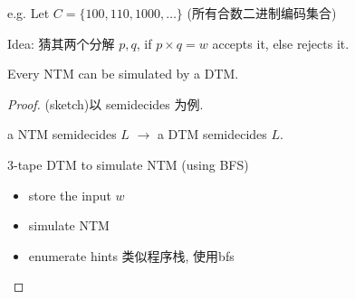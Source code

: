 e.g. Let $C=\{ 100, 110, 1000, \dots \}$ (所有合数二进制编码集合) 

Idea: 猜其两个分解 $p,q$, if $p\times q=w$ accepts it, else rejects it. 

\begin{theorem}
    Every NTM can be simulated by a DTM. 
\end{theorem}
\begin{proof}(sketch)以 semidecides 为例. 

    a NTM semidecides $L$ $\to$ a DTM semidecides $L$. 

    3-tape DTM to simulate NTM (using BFS) 
    \begin{itemize}
        \item store the input $w$
        \item simulate NTM
        \item enumerate hints 类似程序栈, 使用bfs
    \end{itemize}
\end{proof}